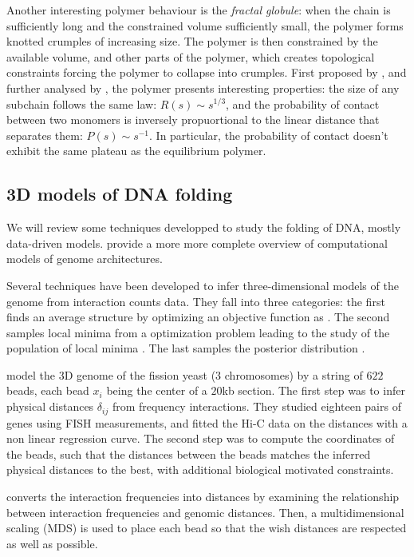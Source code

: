 Another interesting polymer behaviour is the \textit{fractal globule}: when
the chain is sufficiently long and the constrained volume sufficiently small,
the polymer forms knotted crumples of increasing size. The polymer is then
constrained by the available volume, and other parts of the polymer, which
creates topological constraints forcing the polymer to collapse into crumples.
First proposed by \citet{grosberg:role}, and further analysed by
\citet{mirny:fractal}, the polymer presents interesting properties: the size
of any subchain follows the same law: $R(s) \sim s^{1/3}$, and the probability
of contact between two monomers is inversely propuortional to the linear
distance that separates them: $P(s) \sim s^{-1}$. In particular, the
probability of contact doesn't exhibit the same plateau as the equilibrium
polymer.

\subsection{3D models of DNA folding}

We will review some techniques developped to study the folding of DNA, mostly
data-driven models. \citet{rosa:computational} provide a more more complete
overview of computational models of genome architectures.

Several techniques have been developed to infer three-dimensional models of
the genome from interaction counts data. They fall into three categories: the
first finds an average structure by optimizing an objective function as
\citep{tanizawa:mapping, duan:three, ben-elazar:spatial}. The
second samples local minima from a optimization problem leading to the study
of the population of local minima \citep{bau:three-dimensional}. The last
samples the posterior distribution \citep{rousseau:three}.

\citet{tanizawa:mapping} model the 3D genome of the fission yeast (3
chromosomes) by a string of $622$ beads, each bead $x_i$ being the center of a
$20$kb section. The first step was to infer physical distances $\delta_{ij}$
from frequency interactions. They studied eighteen pairs of genes using FISH
measurements, and fitted the Hi-C data on the distances with a non linear
regression curve. The second step was to compute the coordinates of the beads,
such that the distances between the beads matches the inferred physical
distances to the best, with additional biological motivated constraints.

\citet{duan:three} converts the interaction frequencies into distances by
examining the relationship between interaction frequencies and genomic
distances. Then, a multidimensional scaling (MDS) is used to place each bead
so that the wish distances are respected as well as possible.

